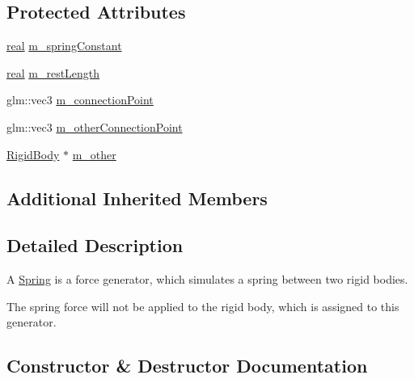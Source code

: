 \subsection*{Protected Attributes}
\begin{DoxyCompactItemize}
\item 
\mbox{\hyperlink{namespacer3_ab2016b3e3f743fb735afce242f0dc1eb}{real}} \mbox{\hyperlink{classr3_1_1_spring_a06963e33fd2c3f8e25ddd345324b292b}{m\+\_\+spring\+Constant}}
\item 
\mbox{\hyperlink{namespacer3_ab2016b3e3f743fb735afce242f0dc1eb}{real}} \mbox{\hyperlink{classr3_1_1_spring_ad1c8ba98c782bee7f9896d0c868b9ee7}{m\+\_\+rest\+Length}}
\item 
glm\+::vec3 \mbox{\hyperlink{classr3_1_1_spring_a3c1e08e176ebc363b9f217875036955d}{m\+\_\+connection\+Point}}
\item 
glm\+::vec3 \mbox{\hyperlink{classr3_1_1_spring_a7a1c5a5c2960bbf756dac88986e939ae}{m\+\_\+other\+Connection\+Point}}
\item 
\mbox{\hyperlink{classr3_1_1_rigid_body}{Rigid\+Body}} $\ast$ \mbox{\hyperlink{classr3_1_1_spring_ac762f73af2e30d8f6f1e6b0a1575d49e}{m\+\_\+other}}
\end{DoxyCompactItemize}
\subsection*{Additional Inherited Members}


\subsection{Detailed Description}
A \mbox{\hyperlink{classr3_1_1_spring}{Spring}} is a force generator, which simulates a spring between two rigid bodies. 

The spring force will not be applied to the rigid body, which is assigned to this generator. 

\subsection{Constructor \& Destructor Documentation}
\mbox{\label{classr3_1_1_spring_ae96ec521b5609d2ace1476aec3c831f3}} 
